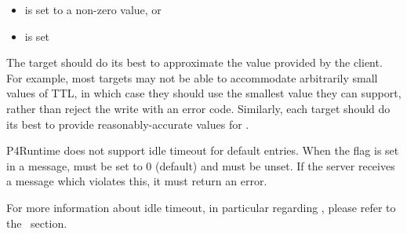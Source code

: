 \documentclass[11pt]{article}
\begin{document}
{%
\begin{itemize}[noitemsep,topsep=\mdcompacttopsep]%

\item{} is set to a non-zero value, or%

\item{} is set%
\end{itemize}%

\noindent{}The target should do its best to approximate the  value
provided by the client. For example, most targets may not be able to accommodate
arbitrarily small values of TTL, in which case they should use the smallest
value they can support, rather than reject the  write with an error
code. Similarly, each target should do its best to provide reasonably-accurate
values for .%

P4Runtime does not support idle timeout for default entries. When the
 flag is set in a  message, 
must be set to 0 (default) and  must be unset. If the
server receives a  message which violates this, it must return an
 error.%

For more information about idle timeout, in particular regarding
, please refer to the~ section.%

}
\end{document}
